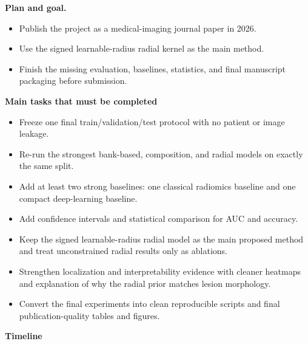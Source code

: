 \documentclass[10pt]{article}
\begin{document}
\textbf{Plan and goal.}
\begin{itemize}
    \item Publish the project as a medical-imaging journal paper in 2026.
    \item Use the signed learnable-radius radial kernel as the main method.
    \item Finish the missing evaluation, baselines, statistics, and final manuscript packaging before submission.
\end{itemize}

\textbf{Main tasks that must be completed}

\begin{itemize}
    \item Freeze one final train/validation/test protocol with no patient or image leakage.
    \item Re-run the strongest bank-based, composition, and radial models on exactly the same split.
    \item Add at least two strong baselines: one classical radiomics baseline and one compact deep-learning baseline.
    \item Add confidence intervals and statistical comparison for AUC and accuracy.
    \item Keep the signed learnable-radius radial model as the main proposed method and treat unconstrained radial results only as ablations.
    \item Strengthen localization and interpretability evidence with cleaner heatmaps and explanation of why the radial prior matches lesion morphology.
    \item Convert the final experiments into clean reproducible scripts and final publication-quality tables and figures.
\end{itemize}

\textbf{Timeline}
\end{document}
